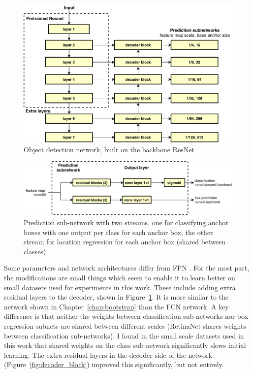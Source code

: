 \begin{figure}[htb!]
  \centering
  \includegraphics[width=1.0\linewidth]{figures/annotation/detection_network.pdf}
  \caption{Object detection network, built on the backbone ResNet }  
  \label{fig:detection_network}
\end{figure}

\begin{figure}[htb!]
  \centering
  \includegraphics[width=1.0\linewidth]{figures/annotation/prediction_subnet.pdf}
  \caption{Prediction sub-network with two streams, one for classifying anchor boxes with one output per class for each anchor box, the other stream for location regression for each anchor box (shared between classes)}    
  \label{fig:prediction_subnet}  
\end{figure}


Some parameters and network architectures differ from \gls{FPN} \cite{Lin2017a}. For the most part, the modifications are small things which seem to enable it to learn better on small datasets used for experiments in this work. These include adding extra residual layers to the decoder, shown in Figure~\ref{fig:detection_network}. It is more similar to the network shown in Chapter~\ref{chap:bootstrap} than the \gls{FCN} network. A key difference is that neither the weights between classification sub-networks nor box regression subnets are shared between different scales  (RetinaNet shares weights between classification sub-networks). I found in the small scale datasets used in this work that shared weights on the class sub-network significantly slows initial learning. The extra residual layers in the decoder side of the network (Figure~\ref{fig:decoder_block}) improved this significantly, but not entirely. 



